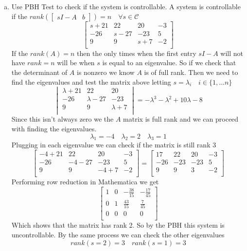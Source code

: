 \documentclass{article}
\begin{document}
\begin{enumerate}[(a)]
\item Use PBH Test to check if the system is controllable.
\newline
\newline
A system is controllable if the $rank\left(\begin{bmatrix} sI - A & b \end{bmatrix}\right) = n \quad \forall s \in \mathcal{C}$
$$
\begin{bmatrix}
s + 21 & 22 & 20 & -3 \\
-26 & s - 27 & -23 & 5 \\
9 & 9 & s + 7  & -2 \\
\end{bmatrix}
$$
If the $rank\left(A\right) = n$ then the only times when the first entry $sI -A$ will not have $rank = n$ will be when $s$ is equal to an eigenvalue.
So if we check that the determinant of $A$ is nonzero we know $A$ is of full rank.
Then we need to find the eigenvalues and test the matrix above letting $s = \lambda_i \quad i \in \{1, ... n\}$
$$
\begin{vmatrix}
\lambda + 21 & 22 & 20 \\
-26 & \lambda - 27 & -23 \\
9 & 9 & \lambda + 7 \\
\end{vmatrix}
= -\lambda^3 - \lambda^2 + 10\lambda -8
$$
Since this isn't always zero we the $A$ matrix is full rank and we can proceed with finding the eigenvalues.
$$ \lambda_1 = -4 \quad \lambda_2 = 2 \quad \lambda_3 = 1 $$
Plugging in each eigenvalue we can check if the matrix is still rank 3
$$
\begin{bmatrix}
-4 + 21 & 22 & 20 & -3 \\
-26 & -4 - 27 & -23 & 5 \\
9 & 9 & -4 + 7  & -2 \\
\end{bmatrix}
=
\begin{bmatrix}
17 & 22 & 20 & -3 \\
-26 & -23 & -23 & 5 \\
9 & 9 & 3  & -2 \\
\end{bmatrix}
$$
Performing row reduction in Mathematica we get
$$
\begin{bmatrix}
1 & 0 & -\frac{38}{15} & -\frac{17}{45} \\
0 & 1 &  \frac{43}{15} &  \frac{7}{45} \\
0 & 0 & 0 & 0 \\
\end{bmatrix}
$$
Which shows that the matrix has rank 2.
So by the PBH this system is uncontrollable.
\newline
\newline
By the same process we can check the other eigenvalues
$$ rank(s=2) = 3 \quad rank(s=1) = 3 $$


\end{enumerate}
\end{document}
